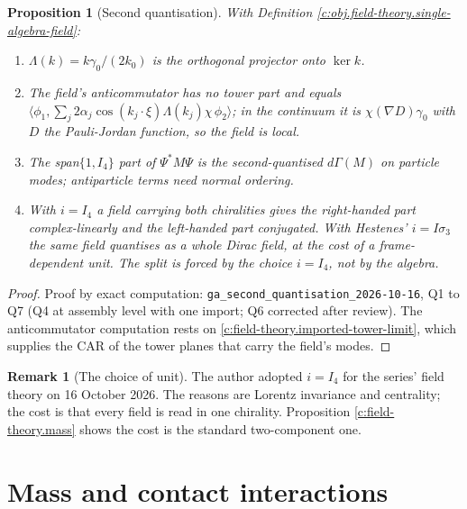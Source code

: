 \documentclass[11pt]{article}
\newtheorem{proposition}[theorem]{Proposition}
\theoremstyle{definition}
\newtheorem{remark}[theorem]{Remark}
\theoremstyle{plain}
\providecommand{\IS}{}\renewcommand{\IS}{I\sigma_3}
\providecommand{\ip}{}\renewcommand{\ip}[2]{\langle #1, #2\rangle}
\begin{document}
\begin{proposition}[Second quantisation]\label{c:field-theory.second-quantisation}
With Definition \ref{c:obj.field-theory.single-algebra-field}:
\begin{enumerate}
\item $\Lambda(k) = k\gamma_0/(2k_0)$ is the orthogonal projector onto $\ker k$.
\item The field's anticommutator has no tower part and equals $\ip{\phi_1}{\sum_j 2\alpha_j\cos(k_j\cdot\xi)\Lambda(k_j)\chi\,\phi_2}$; in the continuum it is $\chi(\nabla D)\gamma_0$ with $D$ the Pauli-Jordan function, so the field is local.
\item The span$\{1, I_4\}$ part of $\Psi^*M\Psi$ is the second-quantised $d\Gamma(M)$ on particle modes; antiparticle terms need normal ordering.
\item With $i = I_4$ a field carrying both chiralities gives the right-handed part complex-linearly and the left-handed part conjugated. With Hestenes' $i = \IS$ the same field quantises as a whole Dirac field, at the cost of a frame-dependent unit. The split is forced by the choice $i = I_4$, not by the algebra.
\end{enumerate}
\end{proposition}
\begin{proof}
Proof by exact computation: \texttt{ga\_second\_quantisation\_2026-10-16}, Q1 to Q7 (Q4 at assembly level with one import; Q6 corrected after review). The anticommutator computation rests on \ref{c:field-theory.imported-tower-limit}, which supplies the CAR of the tower planes that carry the field's modes.

\end{proof}

\begin{remark}[The choice of unit]\label{c:note.field-theory.choice-unit}
The author adopted $i = I_4$ for the series' field theory on 16 October 2026. The reasons are Lorentz invariance and centrality; the cost is that every field is read in one chirality. Proposition \ref{c:field-theory.mass} shows the cost is the standard two-component one.
\end{remark}

\section{Mass and contact interactions}
\end{document}
